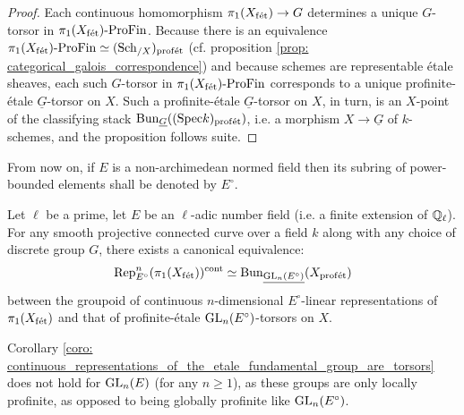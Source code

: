             \begin{proof}
                Each continuous homomorphism $\pi_1(X_{\mathrm{f\acute{e}t}}) \to G$ determines a unique $G$-torsor in $\pi_1(X_{\mathrm{f\acute{e}t}})\text{-}\mathrm{Pro}\mathrm{Fin}$. Because there is an equivalence $\pi_1(X_{\mathrm{f\acute{e}t}})\text{-}\mathrm{Pro}\mathrm{Fin} \simeq (\mathrm{Sch}_{/X})_{\mathrm{prof\acute{e}t}}$ (cf. proposition \ref{prop: categorical_galois_correspondence}) and because schemes are representable \'etale sheaves, each such $G$-torsor in $\pi_1(X_{\mathrm{f\acute{e}t}})\text{-}\mathrm{Pro}\mathrm{Fin}$ corresponds to a unique profinite-\'etale $\underline{G}$-torsor on $X$. Such a profinite-\'etale $\underline{G}$-torsor on $X$, in turn, is an $X$-point of the classifying stack $\mathrm{Bun}_{\underline{G}}((\mathrm{Spec} k)_{\mathrm{prof\acute{e}t}})$, i.e. a morphism $X \to \underline{G}$ of $k$-schemes, and the proposition follows suite.
            \end{proof}
        \begin{convention}
            From now on, if $E$ is a non-archimedean normed field then its subring of power-bounded elements shall be denoted by $E^{\circ}$. 
        \end{convention}
        \begin{corollary} \label{coro: continuous_representations_of_the_etale_fundamental_group_are_torsors}
            Let $\ell$ be a prime, let $E$ be an $\ell$-adic number field (i.e. a finite extension of $\mathbb{Q}_{\ell}$). For any smooth projective connected curve over a field $k$ along with any choice of discrete group $G$, there exists a canonical equivalence:
                $$\mathrm{Rep}^n_{E^{\circ}}(\pi_1(X_{\mathrm{f\acute{e}t}}))^{\mathrm{cont}} \simeq \mathrm{Bun}_{\underline{\operatorname{GL}_n(E^{\circ})}}(X_{\mathrm{prof\acute{e}t}})$$
            between the groupoid of continuous $n$-dimensional $E^{\circ}$-linear representations of $\pi_1(X_{\mathrm{f\acute{e}t}})$ and that of profinite-\'etale $\operatorname{GL}_n(E^{\circ})$-torsors on $X$.
        \end{corollary}
        \begin{remark}
            Corollary \ref{coro: continuous_representations_of_the_etale_fundamental_group_are_torsors} does not hold for $\operatorname{GL}_n(E)$ (for any $n \geq 1$), as these groups are only locally profinite, as opposed to being globally profinite like $\operatorname{GL}_n(E^{\circ})$.
        \end{remark}
    

